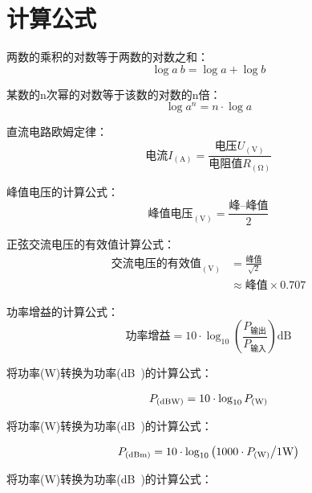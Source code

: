 \newpage

\section{计算公式}

两数的乘积的对数等于两数的对数之和：
\[\log a\: b=\log a+\log b\]

某数的n次幂的对数等于该数的对数的n倍：
\[\log a^n =n \cdot \log a\]

直流电路欧姆定律：
\[\mbox{电流}I_{(\unit{\ampere})} = \frac{\mbox{电压}U_{(\unit{\volt})}}{\mbox{电阻值}R_{(\unit{\ohm})}}\]

峰值电压的计算公式：
\[\mbox{峰值电压}_{(\unit{\volt})} = \frac{\mbox{峰--峰值}}{2}\]

正弦交流电压的有效值计算公式：
\begin{equation*}
  \begin{aligned}
    \mbox{交流电压的有效值}_{(\unit{\volt})} & =\frac{\mbox{峰值}}{\sqrt{2}}   \\
                                     & \approx \mbox{峰值}\times 0.707
  \end{aligned}
\end{equation*}

功率增益的计算公式：
\[\mbox{功率增益}= 10 \cdot \log_{10} \left( {\frac{P_{ \mbox{输出} }}{P_{ \mbox{输入} }}}\right) \unit{\dB}\]

将功率(\unit{\watt})转换为功率(\unit[qualifier-mode=combine]{\deci\bel{}})的计算公式：

\begin{equation*}
  \begin{aligned}
    P_{(\unit[qualifier-mode=combine]{\deci\bel\of{W}})} & = 10 \cdot \log_{10} P_{(\unit{\watt})} \\
  \end{aligned}
\end{equation*}

将功率(\unit{\watt})转换为功率(\unit[qualifier-mode=combine]{\deci\bel{}})的计算公式：

\begin{equation*}
  \begin{aligned}
    P_{(\unit[qualifier-mode=combine]{\deci\bel\of{m}})} & = 10 \cdot \log_{10} \left( 1000 \cdot P_{(\unit{\watt})} \middle/ 1 \unit{\watt} \right) \\
  \end{aligned}
\end{equation*}

将功率(\unit{\watt})转换为功率(\unit[qualifier-mode=combine]{\deci\bel{}})的计算公式：

